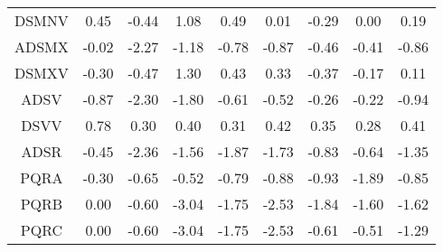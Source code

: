 \begin{longtable}{ | c || c | c | c | c | c | c | c || c |}
DSMNV &  \cellcolor[HTML]{F7F7FF} 0.45 &  \cellcolor[HTML]{FFF7F7} -0.44 &  \cellcolor[HTML]{E7E7FF} 1.08 &  \cellcolor[HTML]{EFEFFF} 0.49 &  \cellcolor[HTML]{FFFFFF} 0.01 &  \cellcolor[HTML]{FFF7F7} -0.29 &  \cellcolor[HTML]{FFFFFF} 0.00 &  \cellcolor[HTML]{F7F7FF} 0.19 \\
ADSMX &  \cellcolor[HTML]{FFFFFF} -0.02 &  \cellcolor[HTML]{FFC7C7} -2.27 &  \cellcolor[HTML]{FFDFDF} -1.18 &  \cellcolor[HTML]{FFEFEF} -0.78 &  \cellcolor[HTML]{FFE7E7} -0.87 &  \cellcolor[HTML]{FFF7F7} -0.46 &  \cellcolor[HTML]{FFF7F7} -0.41 &  \cellcolor[HTML]{FFE7E7} -0.86 \\
DSMXV &  \cellcolor[HTML]{FFF7F7} -0.30 &  \cellcolor[HTML]{FFF7F7} -0.47 &  \cellcolor[HTML]{DFDFFF} 1.30 &  \cellcolor[HTML]{F7F7FF} 0.43 &  \cellcolor[HTML]{F7F7FF} 0.33 &  \cellcolor[HTML]{FFF7F7} -0.37 &  \cellcolor[HTML]{FFF7F7} -0.17 &  \cellcolor[HTML]{FFFFFF} 0.11 \\
ADSV &  \cellcolor[HTML]{FFE7E7} -0.87 &  \cellcolor[HTML]{FFC7C7} -2.30 &  \cellcolor[HTML]{FFCFCF} -1.80 &  \cellcolor[HTML]{FFEFEF} -0.61 &  \cellcolor[HTML]{FFEFEF} -0.52 &  \cellcolor[HTML]{FFF7F7} -0.26 &  \cellcolor[HTML]{FFF7F7} -0.22 &  \cellcolor[HTML]{FFE7E7} -0.94 \\
DSVV &  \cellcolor[HTML]{EFEFFF} 0.78 &  \cellcolor[HTML]{F7F7FF} 0.30 &  \cellcolor[HTML]{F7F7FF} 0.40 &  \cellcolor[HTML]{F7F7FF} 0.31 &  \cellcolor[HTML]{F7F7FF} 0.42 &  \cellcolor[HTML]{F7F7FF} 0.35 &  \cellcolor[HTML]{F7F7FF} 0.28 &  \cellcolor[HTML]{F7F7FF} 0.41 \\
ADSR &  \cellcolor[HTML]{FFF7F7} -0.45 &  \cellcolor[HTML]{FFC7C7} -2.36 &  \cellcolor[HTML]{FFD7D7} -1.56 &  \cellcolor[HTML]{FFCFCF} -1.87 &  \cellcolor[HTML]{FFD7D7} -1.73 &  \cellcolor[HTML]{FFE7E7} -0.83 &  \cellcolor[HTML]{FFEFEF} -0.64 &  \cellcolor[HTML]{FFDFDF} -1.35 \\
PQRA &  \cellcolor[HTML]{FFF7F7} -0.30 &  \cellcolor[HTML]{FFEFEF} -0.65 &  \cellcolor[HTML]{FFEFEF} -0.52 &  \cellcolor[HTML]{FFEFEF} -0.79 &  \cellcolor[HTML]{FFE7E7} -0.88 &  \cellcolor[HTML]{FFE7E7} -0.93 &  \cellcolor[HTML]{FFCFCF} -1.89 &  \cellcolor[HTML]{FFE7E7} -0.85 \\
PQRB &  \cellcolor[HTML]{FFFFFF} 0.00 &  \cellcolor[HTML]{FFEFEF} -0.60 &  \cellcolor[HTML]{FFAFAF} -3.04 &  \cellcolor[HTML]{FFCFCF} -1.75 &  \cellcolor[HTML]{FFBFBF} -2.53 &  \cellcolor[HTML]{FFCFCF} -1.84 &  \cellcolor[HTML]{FFD7D7} -1.60 &  \cellcolor[HTML]{FFD7D7} -1.62 \\
PQRC &  \cellcolor[HTML]{FFFFFF} 0.00 &  \cellcolor[HTML]{FFEFEF} -0.60 &  \cellcolor[HTML]{FFAFAF} -3.04 &  \cellcolor[HTML]{FFCFCF} -1.75 &  \cellcolor[HTML]{FFBFBF} -2.53 &  \cellcolor[HTML]{FFEFEF} -0.61 &  \cellcolor[HTML]{FFEFEF} -0.51 &  \cellcolor[HTML]{FFDFDF} -1.29 \\

\end{longtable}
